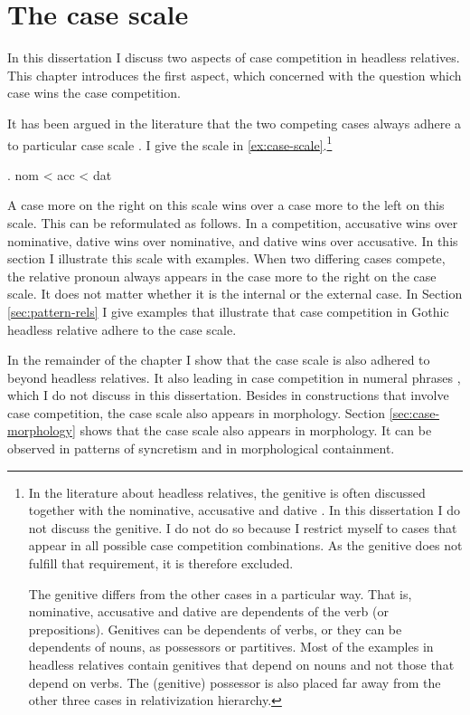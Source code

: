 
\chapter{The case scale}\label{ch:recurring}

In this dissertation I discuss two aspects of case competition in headless relatives.
This chapter introduces the first aspect, which concerned with the question which case wins the case competition.

It has been argued in the literature that the two competing cases always adhere a to particular case scale \citep[cf.][]{harbert1978,pittner1995,vogel2001,grosu2003,caha2019,bergsma2019}. I give the scale in \ref{ex:case-scale}.\footnote{
In the literature about headless relatives, the genitive is often discussed together with the nominative, accusative and dative \citep[cf.][]{harbert1978,pittner1995}. In this dissertation I do not discuss the genitive. I do not do so because I restrict myself to cases that appear in all possible case competition combinations. As the genitive does not fulfill that requirement, it is therefore excluded.

The genitive differs from the other cases in a particular way. That is, nominative, accusative and dative are dependents of the verb (or prepositions). Genitives can be dependents of verbs, or they can be dependents of nouns, as possessors or partitives. Most of the examples in headless relatives contain genitives that depend on nouns and not those that depend on verbs. The (genitive) possessor is also placed far away from the other three cases in  relativization hierarchy.
}

\ex. \ac{nom} < \ac{acc} < \ac{dat}\label{ex:case-scale}

A case more on the right on this scale wins over a case more to the left on this scale.
This can be reformulated as follows. In a competition, accusative wins over nominative, dative wins over nominative, and dative wins over accusative. In this section I illustrate this scale with examples. When two differing cases compete, the relative pronoun always appears in the case more to the right on the case scale. It does not matter whether it is the internal or the external case.
In Section \ref{sec:pattern-rels} I give examples that illustrate that case competition in Gothic headless relative adhere to the case scale.

In the remainder of the chapter I show that the case scale is also adhered to beyond headless relatives. It also leading in case competition in numeral phrases \citep{caha2019}, which I do not discuss in this dissertation.
Besides in constructions that involve case competition, the case scale also appears in morphology. Section \ref{sec:case-morphology} shows that the case scale also appears in morphology. It can be observed in patterns of syncretism and in morphological containment.



